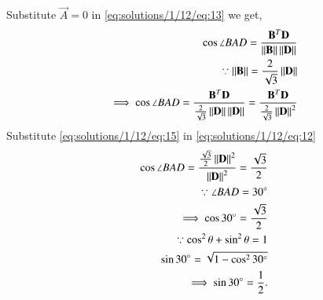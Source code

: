 Substitute $\vec{A}=0$ in \eqref{eq:solutions/1/12/eq:13} we get,
\begin{align}
    \cos{\angle{BAD}}=\frac{\mathbf{B}^T\mathbf{D}}{\left\lVert\mathbf{B}\right\rVert\left\lVert\mathbf{D}\right\rVert}\\
 \because\left\lVert\mathbf{B}\right\rVert=\frac{2}{\sqrt{3}}\left\lVert\mathbf{D}\right\rVert\\
     \label{eq:solutions/1/12/eq:12}\implies\cos{\angle{BAD}}=\frac{\mathbf{B}^T\mathbf{D}}{\frac{2}{\sqrt{3}}\left\lVert\mathbf{D}\right\rVert\left\lVert\mathbf{D}\right\rVert} = \frac{\mathbf{B}^T\mathbf{D}}{\frac{2}{\sqrt{3}}\left\lVert\mathbf{D}\right\rVert^2}
\end{align}
Substitute \eqref{eq:solutions/1/12/eq:15} in \eqref{eq:solutions/1/12/eq:12}
\begin{align}
\cos\angle{BAD} = \frac{{\frac{\sqrt{3}}{2}\left\lVert\mathbf{D}\right\rVert^2}}{\left\lVert\mathbf{D}\right\rVert^2}= \frac{\sqrt{3}}{2}\\
\because \angle{BAD}= 30\degree\\
\implies \cos{30\degree}= \frac{\sqrt{3}}{2}\\
    \because \cos^2\theta +\sin^2\theta = 1\\
     \sin30\degree = \sqrt{1-\cos^230\degree}\\
    \implies\sin30\degree = \frac{1}{2}.
\end{align} 
